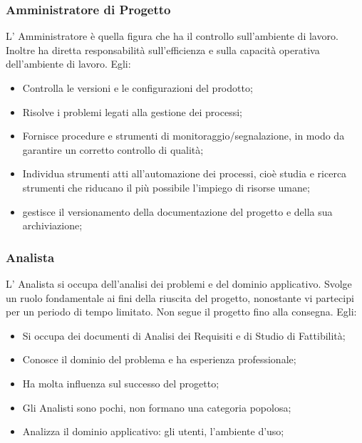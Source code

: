 \subsubsection{Amministratore di Progetto}
L’ Amministratore è quella figura che ha il controllo sull'ambiente di lavoro. Inoltre ha diretta responsabilità sull'efficienza e sulla capacità operativa dell'ambiente di lavoro.
Egli:
\begin{itemize}
\item{Controlla le versioni e le configurazioni del prodotto;}
\item{Risolve i problemi legati alla gestione dei processi;}
\item{Fornisce procedure e strumenti di monitoraggio/segnalazione, in modo da garantire un corretto controllo di qualità;}
\item{Individua strumenti atti all’automazione dei processi, cioè studia e ricerca strumenti che riducano il più possibile l'impiego di risorse umane;}
\item{gestisce il versionamento della documentazione del progetto e della sua archiviazione;}
\end{itemize}


\subsubsection{Analista}
L’ Analista si occupa dell’analisi dei problemi e del dominio applicativo. Svolge un ruolo fondamentale ai fini della riuscita del progetto, nonostante vi partecipi per un periodo di tempo limitato. Non segue il progetto fino alla consegna.
Egli:
\begin{itemize}
\item{Si occupa dei documenti di Analisi dei Requisiti e di Studio di Fattibilità;}
\item{Conosce il dominio del problema e ha esperienza professionale;}
\item{Ha molta influenza sul successo del progetto;}
\item{Gli Analisti sono pochi, non formano una categoria popolosa;}
\item{Analizza il dominio applicativo:  gli utenti, l’ambiente d’uso;}
\end{itemize}


